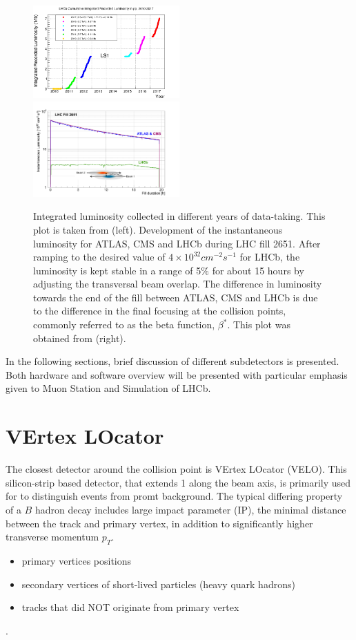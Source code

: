 \begin{figure}
	\centering
	\includegraphics[width = 0.5\textwidth]{figs/detector/intlumi.png}%
        \includegraphics[width = 0.5\textwidth]{figs/detector/lumicompare.png}
	\caption{Integrated luminosity collected in different years of data-taking. This plot is taken from \cite{lumiover} (left). Development of the instantaneous luminosity for \Gls{ATLAS}, \Gls{CMS} and \Gls{LHCb} during LHC fill 2651. After ramping to the desired value of $4\times10^{32}cm^{-2}s^{-1}$
for LHCb, the luminosity is kept stable in a range of 5$\%$ for about 15 hours by adjusting the transversal beam overlap. The difference in luminosity towards the end of the fill between ATLAS, \Gls{CMS} and \Gls{LHCb} is due to the difference in the final focusing at the collision points, commonly referred to as the beta function, $\beta^{*}$. This plot was obtained from \cite{LHCb-DP-2014-002} (right).}
	\label{fig:lhcbintlumi}
\end{figure}

In the following sections, brief discussion of different subdetectors is presented. Both hardware and software overview will be presented with particular emphasis given to Muon Station and Simulation of LHCb.

\section{VErtex LOcator}
The closest detector around the collision point is VErtex LOcator (\Gls{VELO}). This silicon-strip based detector, that extends 1 \m along the beam axis, is primarily used for to distinguish events from promt background. The typical differing property of a $B$ hadron decay includes large impact parameter (\Gls{IP}), the minimal distance between the track and primary vertex, in addition to significantly higher transverse momentum $p_{T}$. 
\begin{itemize}
\item primary vertices positions
\item secondary vertices of short-lived particles (heavy quark hadrons)
\item tracks that did NOT originate from primary vertex
\end{itemize}.



